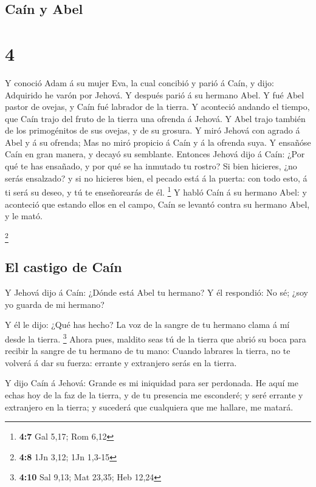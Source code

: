 \hypertarget{cauxedn-y-abel}{%
\subsection{Caín y Abel}\label{cauxedn-y-abel}}

\hypertarget{section-3}{%
\section{4}\label{section-3}}

 Y conoció Adam á su mujer Eva, la cual concibió y parió á
Caín, y dijo: Adquirido he varón por Jehová.  Y después
parió á su hermano Abel. Y fué Abel pastor de ovejas, y Caín fué
labrador de la tierra.  Y aconteció andando el tiempo, que
Caín trajo del fruto de la tierra una ofrenda á Jehová.  Y
Abel trajo también de los primogénitos de sus ovejas, y de su grosura. Y
miró Jehová con agrado á Abel y á su ofrenda;  Mas no miró
propicio á Caín y á la ofrenda suya. Y ensañóse Caín en gran manera, y
decayó su semblante.  Entonces Jehová dijo á Caín: ¿Por qué
te has ensañado, y por qué se ha inmutado tu rostro?  Si
bien hicieres, ¿no serás ensalzado? y si no hicieres bien, el pecado
está á la puerta: con todo esto, á ti será su deseo, y tú te
enseñorearás de él. \footnote{\textbf{4:7} Gal 5,17; Rom 6,12}
 Y habló Caín á su hermano Abel: y aconteció que estando
ellos en el campo, Caín se levantó contra su hermano Abel, y le mató.

\footnote{\textbf{4:8} 1Jn 3,12; 1Jn 1,3-15}

\hypertarget{el-castigo-de-cauxedn}{%
\subsection{El castigo de Caín}\label{el-castigo-de-cauxedn}}

 Y Jehová dijo á Caín: ¿Dónde está Abel tu hermano? Y él
respondió: No sé; ¿soy yo guarda de mi hermano?

 Y él le dijo: ¿Qué has hecho? La voz de la sangre de tu
hermano clama á mí desde la tierra. \footnote{\textbf{4:10} Sal 9,13;
  Mat 23,35; Heb 12,24}  Ahora pues, maldito seas tú de la
tierra que abrió su boca para recibir la sangre de tu hermano de tu
mano:  Cuando labrares la tierra, no te volverá á dar su
fuerza: errante y extranjero serás en la tierra.

 Y dijo Caín á Jehová: Grande es mi iniquidad para ser
perdonada.  He aquí me echas hoy de la faz de la tierra, y
de tu presencia me esconderé; y seré errante y extranjero en la tierra;
y sucederá que cualquiera que me hallare, me matará.

